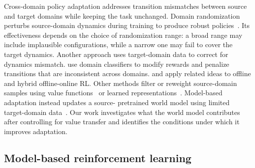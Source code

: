 \documentclass{article} %
\begin{document}
Cross-domain policy adaptation addresses transition mismatches between source and target domains while keeping the task unchanged. Domain randomization perturbs source-domain dynamics during training to produce robust policies~\citep{tobin2017domain, peng2018sim, tiboni2023dropo, tiboni2024domain}. Its effectiveness depends on the choice of randomization range: a broad range may include implausible configurations, while a narrow one may fail to cover the target dynamics. Another approach uses target-domain data to correct for dynamics mismatch. \citet{eysenbach2020off} use domain classifiers to modify rewards and penalize transitions that are inconsistent across domains. \citet{liu2022dara} and \citet{niu2022trust} apply related ideas to offline and hybrid offline-online RL. Other methods filter or reweight source-domain samples using value functions~\citep{xu2023cross} or learned representations~\citep{lyu2024cross}. Model-based adaptation instead updates a source- pretrained world model using limited target-domain data~\citep{yin2025rapidly, levy2026simulation}. Our work investigates what the world model contributes after controlling for value transfer and identifies the conditions under which it improves adaptation.



\subsection{Model-based reinforcement learning}
\label{sec:mbrl}
\end{document}
